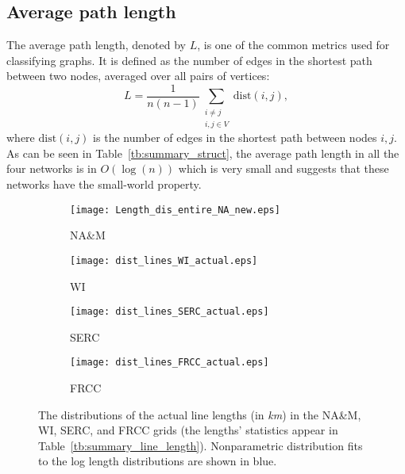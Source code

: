 \documentclass[10pt,journal]{IEEEtran}
\begin{document}
\subsection{Average path length}
The average path length, denoted by $L$, is one of the common metrics used for classifying graphs. It is defined as the number of edges in the shortest path between two nodes, averaged over all pairs of vertices:
\begin{equation*}
L=\frac{1}{n(n-1)}\sum_{\substack{i\neq j\\i,j\in V}} \text{dist}(i,j),
\end{equation*}
where $\text{dist}(i,j)$ is the number of edges in the shortest path between nodes $i,j$. As can be seen in Table~\ref{tb:summary_struct}, the average path length in all the four networks is in $O(\log(n))$ which is very small and suggests that these networks have the small-world property.


\begin{figure*}[t]
\centering
\begin{subfigure}[b]{0.24\textwidth}
\vspace*{-0.2cm}
\texttt{[image: Length\_dis\_entire\_NA\_new.eps]}
\vspace*{-0.2cm}
\caption{NA\&M}
\end{subfigure}
\begin{subfigure}[b]{0.24\textwidth}
\vspace*{-0.2cm}
\texttt{[image: dist\_lines\_WI\_actual.eps]}
\vspace*{-0.2cm}
\caption{WI}
\end{subfigure}
\begin{subfigure}[b]{0.24\textwidth}
\vspace*{-0.2cm}
\texttt{[image: dist\_lines\_SERC\_actual.eps]}
\vspace*{-0.2cm}
\caption{SERC}
\end{subfigure}
\begin{subfigure}[b]{0.24\textwidth}
\vspace*{-0.2cm}
\texttt{[image: dist\_lines\_FRCC\_actual.eps]}
\vspace*{-0.2cm}
\caption{FRCC}
\end{subfigure}
\caption{The distributions of the actual line lengths (in \emph{km}) in the NA\&M, WI, SERC, and FRCC grids (the lengths' statistics appear in Table~\ref{tb:summary_line_length}). Nonparametric distribution fits to the log length distributions are shown in blue.}
\label{fig:dist_lines_WI}
\vspace*{0.2cm}
\end{figure*}
\end{document}
